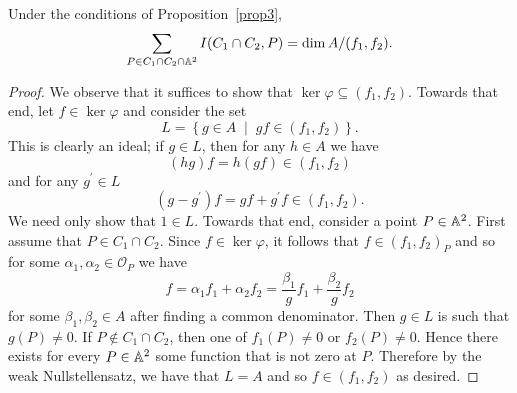 \documentclass[10pt]{amsart}
\begin{document}
\begin{prop}\label{prop4}
  Under the conditions of Proposition~\ref{prop3}, 
  $$\sum_{P \in C_1 \cap C_2 \cap \mathbb{A}^2} I(C_1 \cap C_2, P) = \dim A / (f_1, f_2).$$
  
  \begin{proof}
    We observe that it suffices to show that $\ker\varphi \subseteq (f_1, f_2)$.
    Towards that end, let $f \in \ker\varphi$ and consider the set 
    $$L = \left\{ g \in A \;\middle\vert\; gf \in (f_1, f_2)\right\}.$$
    This is clearly an ideal; if $g \in L$, then for any $h \in A$ we have 
    $$(hg)f = h(gf) \in (f_1, f_2)$$
    and for any $g^\prime \in L$
    $$(g - g^\prime)f = gf + g^\prime f\in (f_1, f_2).$$
    We need only show that $1 \in L$.
    Towards that end, consider a point $P \in \mathbb{A}^2$.
    First assume that  $P \in C_1 \cap C_2$.
    Since $f \in \ker\varphi$, it follows that $f \in (f_1, f_2)_P$ and so for some $\alpha_1, \alpha_2 \in \mathcal{O}_P$ we have
    $$f = \alpha_1 f_1 + \alpha_2 f_2 = \frac{\beta_1}{g} f_1 + \frac{\beta_2}{g} f_2$$
    for some $\beta_1, \beta_2 \in A$ after finding a common denominator.
    Then $g \in L$ is such that $g(P) \neq 0$.
    If $P \not \in C_1 \cap C_2$, then one of $f_1(P) \neq 0$ or $f_2(P) \neq 0$.
    Hence there exists for every $P \in \mathbb{A}^2$ some function that is not zero at $P$.
    Therefore by the weak Nullstellensatz, we have that $L = A$ and so $f \in (f_1, f_2)$ as desired.
  \end{proof}
\end{prop}
\end{document}
